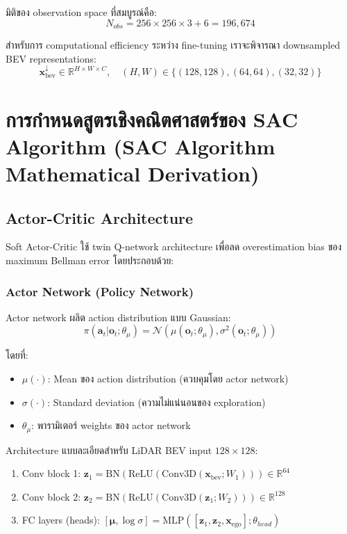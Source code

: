 \documentclass[10pt,a4paper,twocolumn]{article}
\begin{document}
มิติของ observation space ที่สมบูรณ์คือ:
\begin{equation}\label{eq:total-dim}
    N_{obs} = 256 \times 256 \times 3 + 6 = 196,674
\end{equation}

สำหรับการ computational efficiency ระหว่าง fine-tuning เราจะพิจารณา downsampled BEV representations:
\begin{equation}\label{eq:bev-downsampling}
    \mathbf{x}_{\text{bev}}^{\downarrow} \in \mathbb{R}^{H \times W \times C}, \quad (H,W) \in \{(128,128), (64,64), (32,32)\}
\end{equation}

\section{การกำหนดสูตรเชิงคณิตศาสตร์ของ SAC Algorithm (SAC Algorithm Mathematical Derivation)}

\subsection{Actor-Critic Architecture}

Soft Actor-Critic ใช้ twin Q-network architecture เพื่อลด overestimation bias ของ maximum Bellman error โดยประกอบด้วย:

\subsubsection{Actor Network (Policy Network)}
Actor network ผลิต action distribution แบบ Gaussian:
\begin{equation}\label{eq:actor-distribution}
    \pi(\mathbf{a}_t | \mathbf{o}_t; \theta_{\mu}) = \mathcal{N}\left(\mu(\mathbf{o}_t; \theta_{\mu}), \sigma^2(\mathbf{o}_t; \theta_{\mu})\right)
\end{equation}

โดยที่:
\begin{itemize}
    \item $\mu(\cdot)$: Mean ของ action distribution (ควบคุมโดย actor network)
    \item $\sigma(\cdot)$: Standard deviation (ความไม่แน่นอนของ exploration)
    \item $\theta_{\mu}$: พารามิเตอร์ weights ของ actor network
\end{itemize}

Architecture แบบละเอียดสำหรับ LiDAR BEV input $128 \times 128$:
\begin{enumerate}
    \item Conv block 1: $\mathbf{z}_1 = \text{BN}\left(\text{ReLU}(\text{Conv3D}(\mathbf{x}_{\text{bev}}; W_1))\right) \in \mathbb{R}^{64}$
    
    \item Conv block 2: $\mathbf{z}_2 = \text{BN}\left(\text{ReLU}(\text{Conv3D}(\mathbf{z}_1; W_2))\right) \in \mathbb{R}^{128}$
    
    \item FC layers (heads): $[\boldsymbol{\mu}, \log \sigma] = \text{MLP}([\mathbf{z}_1, \mathbf{z}_2, \mathbf{x}_{\text{ego}}]; \theta_{head})$
\end{enumerate}
\end{document}
